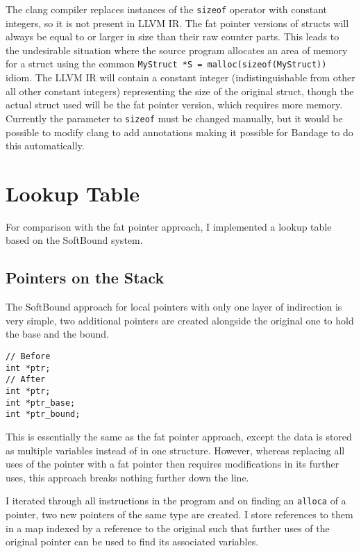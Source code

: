 The clang compiler replaces instances of the \verb!sizeof! operator with constant integers, so it is not present in LLVM IR.
The fat pointer versions of structs will always be equal to or larger in size than their raw counter parts.
This leads to the undesirable situation where the source program allocates an area of memory for a struct using the common \verb!MyStruct *S = malloc(sizeof(MyStruct))! idiom.
The LLVM IR will contain a constant integer (indistinguishable from other all other constant integers) representing the size of the original struct, though the actual struct used will be the fat pointer version, which requires more memory.
Currently the parameter to \verb!sizeof! must be changed manually, but it would be possible to modify clang to add annotations making it possible for Bandage to do this automatically.


\section{Lookup Table}

For comparison with the fat pointer approach, I implemented a lookup table based on the SoftBound system.

\subsection{Pointers on the Stack}

The SoftBound approach for local pointers with only one layer of indirection is very simple, two additional pointers are created alongside the original one to hold the base and the bound.

\begin{verbatim}
// Before
int *ptr;
// After
int *ptr;
int *ptr_base;
int *ptr_bound;
\end{verbatim}

This is essentially the same as the fat pointer approach, except the data is stored as multiple variables instead of in one structure.
However, whereas replacing all uses of the pointer with a fat pointer then requires modifications in its further uses, this approach breaks nothing further down the line.

I iterated through all instructions in the program and on finding an \verb!alloca! of a pointer, two new pointers of the same type are created.
I store references to them in a map indexed by a reference to the original such that further uses of the original pointer can be used to find its associated variables.

